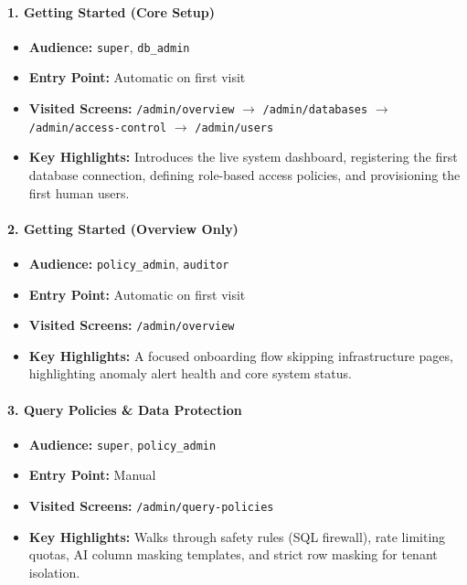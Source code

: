 \paragraph{1. Getting Started (Core Setup)}
\begin{itemize}
    \item \textbf{Audience:} \texttt{super}, \texttt{db\_admin}
    \item \textbf{Entry Point:} Automatic on first visit
    \item \textbf{Visited Screens:} \texttt{/admin/overview} $\rightarrow$ \texttt{/admin/databases} $\rightarrow$ \texttt{/admin/access-control} $\rightarrow$ \texttt{/admin/users}
    \item \textbf{Key Highlights:} Introduces the live system dashboard, registering the first database connection, defining role-based access policies, and provisioning the first human users.
\end{itemize}

\paragraph{2. Getting Started (Overview Only)}
\begin{itemize}
    \item \textbf{Audience:} \texttt{policy\_admin}, \texttt{auditor}
    \item \textbf{Entry Point:} Automatic on first visit
    \item \textbf{Visited Screens:} \texttt{/admin/overview}
    \item \textbf{Key Highlights:} A focused onboarding flow skipping infrastructure pages, highlighting anomaly alert health and core system status.
\end{itemize}

\paragraph{3. Query Policies \& Data Protection}
\begin{itemize}
    \item \textbf{Audience:} \texttt{super}, \texttt{policy\_admin}
    \item \textbf{Entry Point:} Manual
    \item \textbf{Visited Screens:} \texttt{/admin/query-policies}
    \item \textbf{Key Highlights:} Walks through safety rules (SQL firewall), rate limiting quotas, AI column masking templates, and strict row masking for tenant isolation.
\end{itemize}

